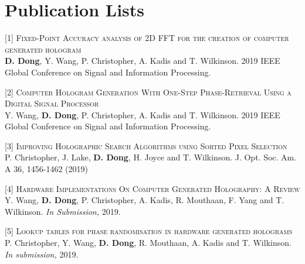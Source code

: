 \documentclass[11pt,a4paper,roman]{moderncv}        %
\begin{document}
\section{Publication Lists}
[1] \textsc{Fixed-Point Accuracy analysis of 2D FFT for the creation of computer generated hologram}\\
\textbf{D. Dong}, Y. Wang, P. Christopher, A. Kadis and T. Wilkinson. 2019 IEEE Global Conference on Signal and Information Processing.

[2] \textsc{Computer Hologram Generation With One-Step Phase-Retrieval Using a Digital Signal Processor}\\
Y. Wang, \textbf{D. Dong}, P. Christopher, A. Kadis and T. Wilkinson. 2019 IEEE Global Conference on Signal and Information Processing.

[3] \textsc{Improving Holographic Search Algorithms using Sorted Pixel Selection}\\
P. Christopher, J. Lake, \textbf{D. Dong}, H. Joyce and T. Wilkinson.  J. Opt. Soc. Am. A 36, 1456-1462 (2019)

[4] \textsc{Hardware Implementations On Computer Generated Holography: A Review}\\
Y. Wang, \textbf{D. Dong}, P. Christopher, A. Kadis, R. Mouthaan, F. Yang and T. Wilkinson. \textit{In Submission,} 2019.

[5] \textsc{Lookup tables for phase randomisation in hardware generated holograms}\\
P. Christopher, Y. Wang, \textbf{D. Dong}, R. Mouthaan, A. Kadis and T. Wilkinson. \textit{In submission,} 2019.
\end{document}
